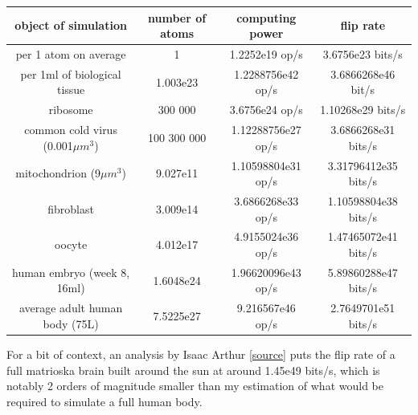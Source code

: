 \documentclass[a4paper]{article}
\begin{document}
	\begin{center}
		\begin{tabular}{|c|c|c|c|}
			\hline
			object of simulation & number of atoms & computing power & flip rate \\\hline
			per 1 atom on average & 1 & 1.2252e19 op/s & 3.6756e23 bits/s \\
			per 1ml of biological tissue & 1.003e23 & 1.2288756e42 op/s & 3.6866268e46 bit/s \\\hline
			ribosome & 300 000 & 3.6756e24 op/s & 1.10268e29 bits/s \\
			common cold virus (0.001$\mu m^3$) & 100 300 000 & 1.12288756e27 op/s & 3.6866268e31 bits/s \\
			mitochondrion (9$\mu m^3$) & 9.027e11 & 1.10598804e31 op/s & 3.31796412e35 bits/s \\
			fibroblast & 3.009e14 & 3.6866268e33 op/s & 1.10598804e38 bits/s \\
			oocyte & 4.012e17 & 4.9155024e36 op/s & 1.47465072e41 bits/s \\
			human embryo (week 8, 16ml) & 1.6048e24 & 1.96620096e43 op/s & 5.89860288e47 bits/s \\
			average adult human body (75L) & 7.5225e27 & 9.216567e46 op/s & 2.7649701e51 bits/s \\\hline
		\end{tabular}
	\end{center}
	
	For a bit of context, an analysis by Isaac Arthur [\href{https://www.youtube.com/embed/Ef-mxjYkllw?t=1116}{source}] puts the flip rate of a full matrioska brain built around the sun at around 1.45e49 bits/s, which is notably 2 orders of magnitude smaller than my estimation of what would be required to simulate a full human body.
	
\end{document}
